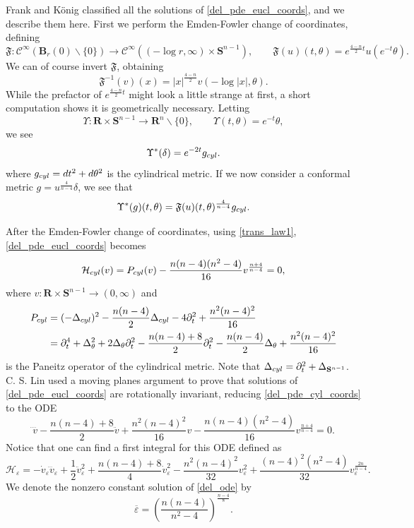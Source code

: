 \documentclass[reqno,11pt]{amsart}
\theoremstyle{tttheorem}
\newcommand{\Ss}{\mathbf{S}}
\newcommand{\R}{\mathbf{R}}
\newcommand{\B}{\mathbf{B}}
\begin{document}
Frank and K\"onig \cite{FK} classified 
all the solutions of \eqref{del_pde_eucl_coords}, and we describe them 
here. First we perform the Emden-Fowler change of 
coordinates, defining 
\begin{equation} \label{emden_fowler_coords} 
\mathfrak{F} : \mathcal{C}^\infty (\B_r(0) \backslash \{ 0 \}) 
\rightarrow \mathcal{C}^\infty ((-\log r, \infty) \times \Ss^{n-1}), 
\qquad \mathfrak{F}(u) (t,\theta) = e^{\frac{4-n}{2}t} u(e^{-t}\theta). 
\end{equation} 
We can of course invert $\mathfrak{F}$, obtaining 
$$\mathfrak{F}^{-1}(v) (x) = |x|^{\frac{4-n}{2}} v(-\log |x|, \theta).$$
While the prefactor of $e^{\frac{4-n}{2}t}$ might 
look a little strange at first, a short computation shows it is geometrically 
necessary. Letting 
$$\Upsilon: \R \times \Ss^{n-1} \rightarrow \R^n \backslash 
\{ 0 \} , \qquad \Upsilon (t,\theta) = e^{-t} \theta,$$
we see 
$$\Upsilon^* (\delta)  = e^{-2t} g_{\rm cyl}.$$ 
where $g_{\rm cyl}=dt^2+d\theta^2$ is the cylindrical metric. If we now consider a conformal metric $g= u^{\frac{4}{n-4}} \delta$, we 
see that 
$$\Upsilon^* (g)(t,\theta)  =  \mathfrak{F}(u) (t,\theta)^{\frac{4}{n-4}}
g_{\rm cyl} .$$

After the Emden-Fowler change of coordinates, using \eqref{trans_law1}, \eqref{del_pde_eucl_coords} becomes
\begin{equation} \label{del_pde_cyl_coords} 
\mathcal H_{\rm cyl} (v)=P_{\rm cyl} (v) - \frac{n(n-4)(n^2-4)}{16} v^{\frac{n+4}{n-4}}=0,
\end{equation}
where $v : \R \times \Ss^{n-1} \rightarrow (0,\infty)$ and
\begin{align}
    \label{cyl_paneitz} 
P_{\rm cyl}  & = (-\Delta_{\rm cyl})^2 - \frac{n(n-4)}{2} \Delta_{\rm cyl} 
- 4 \partial_t^2 + \frac{n^2(n-4)^2}{16}\\
& = \partial_t^4 + \Delta_\theta^2+ 2\Delta_\theta \partial_t^2
-\frac{n(n-4)+8}{2}  \partial_t^2 - \frac{n(n-4)}{2} \Delta_\theta + \frac{n^2(n-4)^2}{16}\nonumber
\end{align} is the Paneitz operator of the cylindrical 
metric. Note that $\Delta_{\rm cyl} = 
\partial_t^2 + \Delta_{\Ss^{n-1}}$. C. S. Lin \cite{Lin} used a
moving planes argument to prove that solutions 
of \eqref{del_pde_eucl_coords} are rotationally invariant, 
reducing \eqref{del_pde_cyl_coords} to the ODE 
\begin{equation} \label{del_ode} 
\ddddot v -  \frac{n(n-4)+8}{2} \ddot v + \frac{n^2(n-4)^2}{16} 
v - \frac{n(n-4)(n^2-4)}{16} v^{\frac{n+4}{n-4}}=0. 
\end{equation} 
Notice that one can find a first integral for
this ODE defined as
\begin{equation}\label{eq002}
    \mathcal{H}_\varepsilon = - \dot v_\varepsilon\dddot v_\varepsilon + \frac{1}{2} \ddot v_\varepsilon^2
+  \frac{n(n-4)+8}{4} \dot v_\varepsilon^2- \frac{n^2(n-4)^2}{32} 
v_\varepsilon^2 + \frac{(n-4)^2(n^2-4)}{32} v_\varepsilon^{\frac{2n}{n-4}}.
\end{equation}
We denote the nonzero constant solution of \eqref{del_ode} by 
$$\overline{\varepsilon} = \left ( \frac{n(n-4)}{n^2-4} \right )^{\frac{n-4}{8}}. $$
\end{document}
